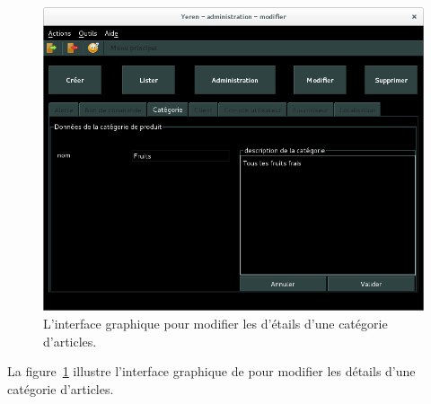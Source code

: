 
\newpage
{}

\begin{figure}[!htpb]
	\centering
	\includegraphics[scale=0.45]{images/categorie-articles-modifier.png}
	\caption{L'interface graphique pour modifier les d'\'etails
			d'une cat\'egorie d'articles.}
	\label{fig:admin-categories-articles-modifier}
\end{figure}

La figure~\ref{fig:admin-categories-articles-modifier}
illustre l'interface graphique de \yeroth pour modifier
les d\'etails d'une cat\'egorie d'articles.


